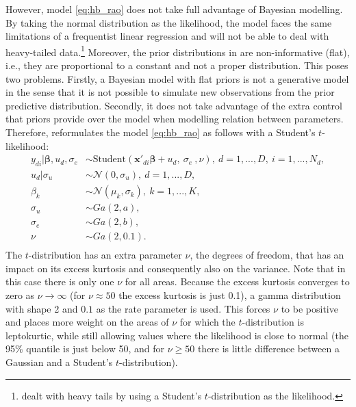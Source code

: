However, model \ref{eq:hb_rao} does not take full advantage of Bayesian modelling.
By taking the normal distribution as the likelihood, the model faces the same limitations of a frequentist linear regression and will not be able to deal with heavy-tailed data.\footnote{\cite{morelli_hierarchical_2021} dealt with heavy tails by using a Student's $t$-distribution as the likelihood.}
Moreover, the prior distributions in \cite{molina_small_2014} are non-informative (flat), i.e., they are proportional to a constant and not a proper distribution.
This poses two problems.
Firstly, a Bayesian model with flat priors is not a generative model in the sense that it is not possible to simulate new observations from the prior predictive distribution.
Secondly, it does not take advantage of the extra control that priors provide over the model when modelling relation between parameters.
Therefore, \cite{morelli_hierarchical_2021} reformulates the model \ref{eq:hb_rao} as follows with a Student's $t$-likelihood:
\begin{equation}
	\begin{split}
		y_{di} |\boldsymbol \beta, u_d, \sigma_e & \sim
            \text{Student}(\boldsymbol{x'}_{di} \boldsymbol \beta + u_d,\ \sigma_e\ , \nu),\ d = 1, ..., D,\ i = 1, ..., N_d, \\
		u_d | \sigma_u & \sim \mathcal N(0, \sigma_u),\ d = 1, ..., D, \\
		\beta_k & \sim \mathcal N(\mu_k, \sigma_k),\ k = 1, ..., K,\\
		\sigma_u & \sim Ga(2, a), \\
		\sigma_e & \sim Ga(2, b), \\
		\nu & \sim Ga(2, 0.1). \\
	\end{split}
	\label{eq:mod_hb}
\end{equation}
The $t$-distribution has an extra parameter $\nu$, the degrees of freedom, that has an impact on its excess kurtosis and consequently also on the variance.
Note that in this case there is only one $\nu$ for all areas.
Because the excess kurtosis converges to zero as $\nu \rightarrow \infty$  (for $\nu \approx 50$ the excess kurtosis is just 0.1), a gamma distribution with shape 2 and $0.1$ as the rate parameter is used.
This forces $\nu$ to be positive and places more weight on the areas of $\nu$ for which the $t$-distribution is leptokurtic, while still allowing values where the likelihood is close to normal (the 95\% quantile is just below 50, and for $\nu \ge 50$ there is little difference between a Gaussian and a Student's $t$-distribution).
